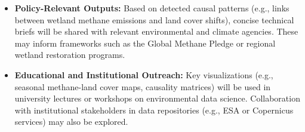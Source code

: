 \begin{itemize}
    \item \textbf{Policy-Relevant Outputs:} Based on detected causal patterns (e.g., links between wetland methane emissions and land cover shifts), concise technical briefs will be shared with relevant environmental and climate agencies. These may inform frameworks such as the Global Methane Pledge or regional wetland restoration programs.

    \item \textbf{Educational and Institutional Outreach:} Key visualizations (e.g., seasonal methane-land cover maps, causality matrices) will be used in university lectures or workshops on environmental data science. Collaboration with institutional stakeholders in data repositories (e.g., ESA or Copernicus services) may also be explored.
\end{itemize}

